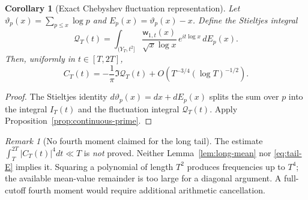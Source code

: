 \documentclass[11pt,leqno]{amsart}
\numberwithin{equation}{section}
\newtheorem{corollary}[theorem]{Corollary}
\theoremstyle{definition}
\theoremstyle{remark}
\newtheorem{remark}[theorem]{Remark}
\newcommand{\1}{\mathbf 1}
\newcommand{\wt}{\mathsf w}
\begin{document}
\begin{corollary}[Exact Chebyshev fluctuation representation]\label{cor:theta-fluct}
Let $\vartheta_{\!p}(x)=\sum_{p\le x}\log p$ and $E_p(x)=\vartheta_{\!p}(x)-x$. Define the Stieltjes integral
\begin{equation}\label{eq:residual-E}
 \mathcal Q_T(t)=\int_{(Y_T,t^2]}
 \frac{\wt_{1,t}(x)}{\sqrt x\log x}\,e^{it\log x}\,dE_p(x).
\end{equation}
Then, uniformly in $t\in[T,2T]$,
\begin{equation}\label{eq:tail-E}
 C_T(t)=-\frac1\pi\Im\mathcal Q_T(t)
 +O\left(T^{-3/4}(\log T)^{-1/2}\right).
\end{equation}
\end{corollary}
\begin{proof}
The Stieltjes identity $d\vartheta_{\!p}(x)=dx+dE_p(x)$ splits the sum over $p$ into the integral $I_T(t)$ and the fluctuation integral $\mathcal Q_T(t)$. Apply Proposition~\ref{prop:continuous-prime}.
\end{proof}
\begin{remark}[No fourth moment claimed for the long tail]\label{rem:long-open}
The estimate $\int_T^{2T}|C_T(t)|^4dt\ll T$ is \emph{not} proved. Neither Lemma~\ref{lem:long-mean} nor \eqref{eq:tail-E} implies it. Squaring a polynomial of length $T^2$ produces frequencies up to $T^4$; the available mean-value remainder is too large for a diagonal argument. A full-cutoff fourth moment would require additional arithmetic cancellation.
\end{remark}
\end{document}
